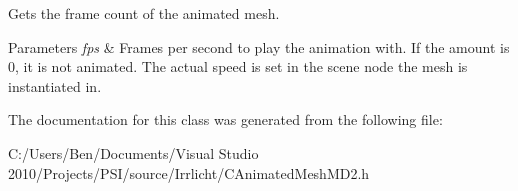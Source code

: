 Gets the frame count of the animated mesh. 


\begin{DoxyParams}{Parameters}
{\em fps} & Frames per second to play the animation with. If the amount is 0, it is not animated. The actual speed is set in the scene node the mesh is instantiated in. \\
\hline
\end{DoxyParams}


The documentation for this class was generated from the following file\-:\begin{DoxyCompactItemize}
\item 
C\-:/\-Users/\-Ben/\-Documents/\-Visual Studio 2010/\-Projects/\-P\-S\-I/source/\-Irrlicht/C\-Animated\-Mesh\-M\-D2.\-h\end{DoxyCompactItemize}
